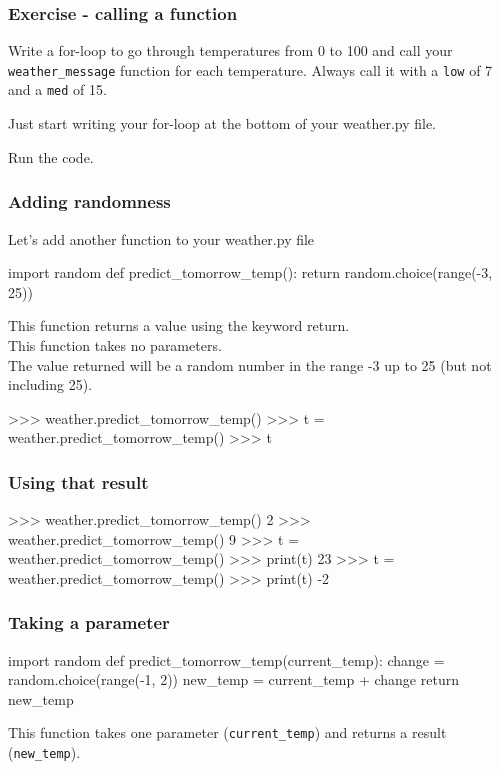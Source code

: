 \documentclass{beamer}
\begin{document}
\begin{frame}[fragile]
\frametitle{Exercise - calling a function}

Write a for-loop to go through temperatures from 0 to
100 and call your \texttt{weather\_message} function for
each temperature. Always call it with a \texttt{low} of 7 and a
\texttt{med} of 15.
\bigskip

Just start writing your for-loop at the bottom of your
weather.py file.
\bigskip

Run the code.
\end{frame}


\begin{frame}[fragile]
\frametitle{Adding randomness}
Let's add another function to your weather.py file
\begin{shaded}
\begin{code}
import random
def predict_tomorrow_temp():
   return random.choice(range(-3, 25))
\end{code}
\end{shaded}

This function returns a value using the keyword return.\\
This function takes no parameters.\\
The value returned will be a random number in the range -3
up to 25 (but not including 25).\\
\begin{code}
>>> weather.predict_tomorrow_temp()
>>> t = weather.predict_tomorrow_temp()
>>> t
\end{code}
\end{frame}

\begin{frame}[fragile]
\frametitle{Using that result}
\begin{code}
>>> weather.predict_tomorrow_temp()
2
>>> weather.predict_tomorrow_temp()
9
>>> t = weather.predict_tomorrow_temp()
>>> print(t)
23
>>> t = weather.predict_tomorrow_temp()
>>> print(t)
-2
\end{code}
\end{frame}

\begin{frame}[fragile]
\frametitle{Taking a parameter}
\begin{shaded}
\begin{code}
import random
def predict_tomorrow_temp(current_temp):
   change = random.choice(range(-1, 2))
   new_temp = current_temp + change
   return new_temp
\end{code}
\end{shaded}
This function takes one parameter (\texttt{current\_temp})
and returns a result (\texttt{new\_temp}).
\end{frame}
\end{document}
